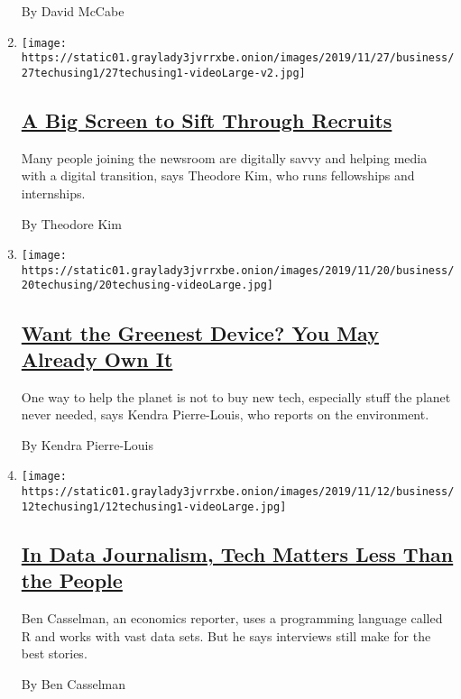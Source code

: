 \begin{enumerate}
  By David McCabe
\item
  \texttt{[image: https://static01.graylady3jvrrxbe.onion/images/2019/11/27/business/27techusing1/27techusing1-videoLarge-v2.jpg]}

  \hypertarget{a-big-screen-to-sift-through-recruits}{%
  \subsection{\texorpdfstring{\href{/2019/11/27/technology/personaltech/young-tech-users.html}{A
  Big Screen to Sift Through
  Recruits}}{A Big Screen to Sift Through Recruits}}\label{a-big-screen-to-sift-through-recruits}}

  Many people joining the newsroom are digitally savvy and helping media
  with a digital transition, says Theodore Kim, who runs fellowships and
  internships.

  By Theodore Kim
\item
  \texttt{[image: https://static01.graylady3jvrrxbe.onion/images/2019/11/20/business/20techusing/20techusing-videoLarge.jpg]}

  \hypertarget{want-the-greenest-device-you-may-already-own-it}{%
  \subsection{\texorpdfstring{\href{/2019/11/20/technology/personaltech/green-environmental-tech.html}{Want
  the Greenest Device? You May Already Own
  It}}{Want the Greenest Device? You May Already Own It}}\label{want-the-greenest-device-you-may-already-own-it}}

  One way to help the planet is not to buy new tech, especially stuff
  the planet never needed, says Kendra Pierre-Louis, who reports on the
  environment.

  By Kendra Pierre-Louis
\item
  \texttt{[image: https://static01.graylady3jvrrxbe.onion/images/2019/11/12/business/12techusing1/12techusing1-videoLarge.jpg]}

  \hypertarget{in-data-journalism-tech-matters-less-than-the-people}{%
  \subsection{\texorpdfstring{\href{/2019/11/13/technology/personaltech/data-journalism-economics.html}{In
  Data Journalism, Tech Matters Less Than the
  People}}{In Data Journalism, Tech Matters Less Than the People}}\label{in-data-journalism-tech-matters-less-than-the-people}}

  Ben Casselman, an economics reporter, uses a programming language
  called R and works with vast data sets. But he says interviews still
  make for the best stories.

  By Ben Casselman
\end{enumerate}

